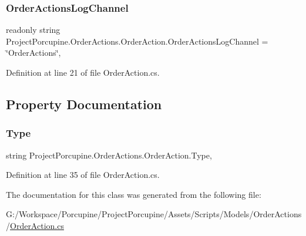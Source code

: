 \subsubsection{\texorpdfstring{Order\+Actions\+Log\+Channel}{OrderActionsLogChannel}}
{\footnotesize\ttfamily readonly string Project\+Porcupine.\+Order\+Actions.\+Order\+Action.\+Order\+Actions\+Log\+Channel = \char`\"{}Order\+Actions\char`\"{}\hspace{0.3cm}{\ttfamily [static]}, {\ttfamily [protected]}}



Definition at line 21 of file Order\+Action.\+cs.



\subsection{Property Documentation}
\mbox{\label{class_project_porcupine_1_1_order_actions_1_1_order_action_a318df761797288d96aeb1a9a70064474}} 
\subsubsection{\texorpdfstring{Type}{Type}}
{\footnotesize\ttfamily string Project\+Porcupine.\+Order\+Actions.\+Order\+Action.\+Type\hspace{0.3cm}{\ttfamily [get]}, {\ttfamily [set]}}



Definition at line 35 of file Order\+Action.\+cs.



The documentation for this class was generated from the following file\+:\begin{DoxyCompactItemize}
\item 
G\+:/\+Workspace/\+Porcupine/\+Project\+Porcupine/\+Assets/\+Scripts/\+Models/\+Order\+Actions/\hyperlink{_order_action_8cs}{Order\+Action.\+cs}\end{DoxyCompactItemize}
